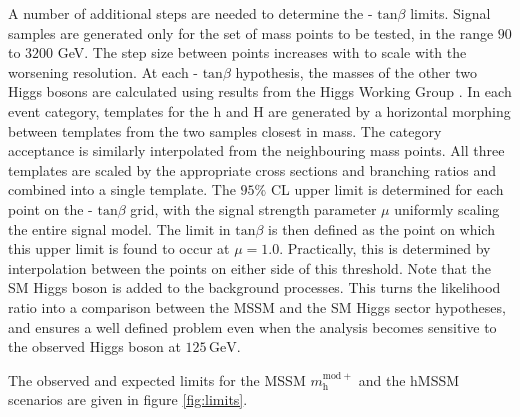 A number of additional steps are needed to determine the \ma -  $\mathrm{tan}\beta$ limits. Signal samples are generated only for the set of \ma mass points to be tested, in the range $90$ to $3200$ GeV. The step size between points increases with \ma to scale with the worsening \mttot resolution. At each \ma -  $\mathrm{tan}\beta$ hypothesis, the masses of the other two Higgs bosons are calculated using results from the Higgs Working Group \cite{Dittmaier:1318996}. In each event category, templates for the h and H are generated by a horizontal morphing \cite{READ1999357} between templates from the two samples
closest in mass. The category acceptance is similarly interpolated from the neighbouring mass
points. All three templates are scaled by the appropriate cross sections and branching ratios and
combined into a single template. The $95\%$ CL upper limit is determined for each point on the \ma -  $\mathrm{tan}\beta$ grid, with the signal strength parameter $\mu$ uniformly scaling the entire signal model. The limit in  $\mathrm{tan}\beta$ is then defined as the point on which this upper limit is found to occur at $\mu = 1.0$. Practically, this is determined by interpolation between the points on either side of this threshold. Note that the SM Higgs boson is added to the background processes. This turns the likelihood ratio into a comparison between the MSSM and the SM Higgs sector hypotheses, and ensures a well defined problem even when the analysis becomes sensitive to the observed Higgs boson at $125\,\mathrm{GeV}$.

The observed and expected limits for the MSSM $m_{\mathrm{h}}^{\mathrm{mod}+}$ and the hMSSM scenarios are given in figure \ref{fig:limits}.


